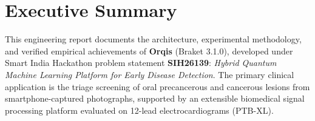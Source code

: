 \documentclass[11pt,a4paper]{report}
\begin{document}
\chapter*{Executive Summary}

This engineering report documents the architecture, experimental methodology, and verified empirical achievements of \textbf{Orqis} (Braket 3.1.0), developed under Smart India Hackathon problem statement \textbf{SIH26139}: \textit{Hybrid Quantum Machine Learning Platform for Early Disease Detection}. The primary clinical application is the triage screening of oral precancerous and cancerous lesions from smartphone-captured photographs, supported by an extensible biomedical signal processing platform evaluated on 12-lead electrocardiograms (PTB-XL).
\end{document}
